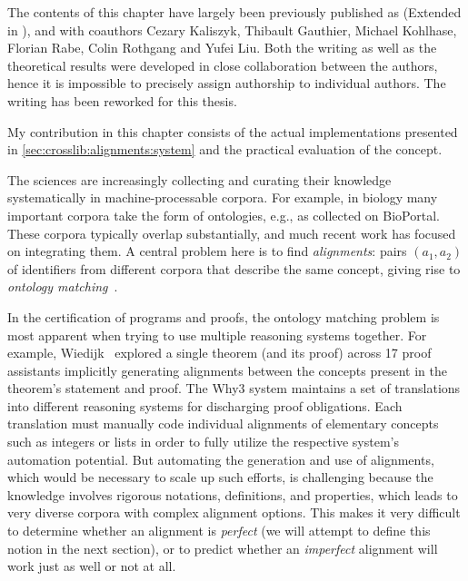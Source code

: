 

\begin{disclaimer*}
	The contents of this chapter have largely been previously published as \cite{MueGauKal:cacfms17} (Extended in \cite{MueGauKal:alignmentsreport17}), \cite{KKMR:alignments:16} and \cite{MRLR:alignments:17} with coauthors Cezary Kaliszyk, Thibault Gauthier, Michael Kohlhase, Florian Rabe, Colin Rothgang and Yufei Liu. Both the writing as well as the theoretical results were developed in close collaboration between the authors, hence it is impossible to precisely assign authorship to individual authors. The writing has been reworked for this thesis.
	
	My contribution in this chapter consists of the actual implementations presented in \autoref{sec:crosslib:alignments:system} and the practical evaluation of the concept.
\end{disclaimer*}

The sciences are increasingly collecting and curating their knowledge systematically in
machine-processable corpora.  For example, in biology many important corpora take the form
of ontologies, e.g., as collected on BioPortal.  These corpora typically overlap
substantially, and much recent work has focused on integrating them.  A central problem
here is to find \emph{alignments}: pairs $(a_1,a_2)$ of identifiers from different corpora
that describe the same concept, giving rise to
\emph{ontology matching}~\cite{euzenat2007ontology}.

In the certification of programs and proofs, the ontology matching problem is most apparent when trying to use multiple reasoning systems together.
For example, Wiedijk~\cite{17provers} explored a single theorem (and its proof) across 17 proof assistants implicitly generating alignments between the concepts present in the theorem's statement and proof.
The Why3 system \cite{why3} maintains a set of translations into different reasoning systems for discharging proof obligations.
Each translation must manually code individual alignments of elementary concepts such as integers or lists in order to fully utilize the respective system's automation potential.
But automating the generation and use of alignments, which would be necessary to scale up such efforts, is challenging because the knowledge involves rigorous notations, definitions, and properties, which leads to very diverse corpora with complex alignment options.
This makes it very difficult to determine whether an alignment is \emph{perfect} (we will attempt to define this notion in the next section), or to predict whether an \emph{imperfect} alignment will work just as well or not at all.


